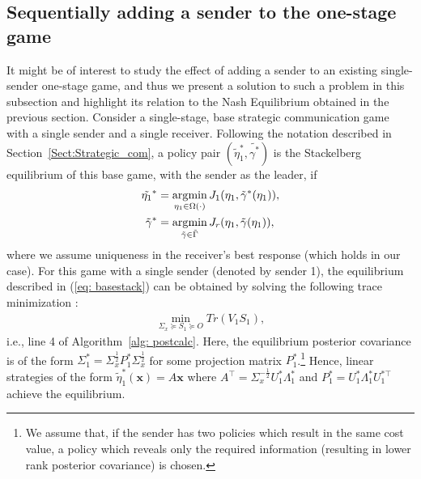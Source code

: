 \documentclass[12pt,journal,onecolumn]{IEEEtran}
\DeclareMathOperator*{\argmin}{\arg\!\min}
\begin{document}


\subsection{Sequentially adding a sender to the one-stage game}\label{subsect:3_C}

It might be of interest to study the effect of adding a sender to an existing single-sender one-stage game, and thus we present a solution to such a problem in this subsection and highlight its relation to the Nash Equilibrium obtained in the previous section. Consider a single-stage, base strategic communication game with a single sender and a single receiver. Following the notation described in Section~\ref{Sect:Strategic_com}, a policy pair $(\tilde{\eta}_1^*,\tilde{\gamma^*})$ is the Stackelberg equilibrium of this base game, with the sender as the leader, if
\begin{align}\label{eq: basestack} \tilde{\eta_1}^*&=\argmin_{\eta_1\in\Omega(\cdot)} J_{1}(\eta_1,\tilde{\gamma}^*(\eta_1)),\\
    \tilde{\gamma}^*&=\argmin_{\tilde{\gamma}\in\Tilde{\Gamma}} J_r(\eta_1,\tilde{\gamma}(\eta_1)),
\end{align}
where we assume uniqueness in the receiver's best response (which holds in our case). For this game with a single sender (denoted by sender 1), the equilibrium described in (\ref{eq: basestack}) can be obtained by solving the following trace minimization \cite{sayin2019hierarchical,tamura2018bayesian}:
\begin{align*} \min_{\Sigma_x\succeq S_1\succeq O}Tr(V_1S_1),
\end{align*}
i.e., line 4 of Algorithm~\ref{alg: postcalc}. Here, the equilibrium posterior covariance is of the form $\Sigma_1^*=\Sigma_x^{\frac{1}{2}}P_1^*\Sigma_x^{\frac{1}{2}}$ for some projection matrix $P_1^*$.\footnote{We assume that, if the sender has two policies which result in the same cost value, a policy which reveals only the required information (resulting in lower rank posterior covariance) is chosen.} Hence, linear strategies of the form $\tilde{\eta}_{1}^*(\boldsymbol{x})=A\boldsymbol{x}$ where $A^\top=\Sigma_x^{-\frac{1}{2}}U_{1}^*\Lambda_{1}^*$ and $P_1^*=U_1^*\Lambda_1^*U_1^{*\top}$ achieve the equilibrium.
\end{document}
